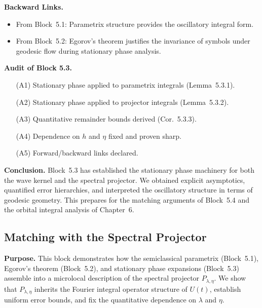 \medskip

\noindent\textbf{Backward Links.}
\begin{itemize}
  \item From Block~5.1: Parametrix structure provides the oscillatory integral form.
  \item From Block~5.2: Egorov’s theorem justifies the invariance of symbols under geodesic flow during stationary phase analysis.
\end{itemize}

\medskip

\noindent\textbf{Audit of Block 5.3.}
\begin{itemize}
  \item[(A1)] Stationary phase applied to parametrix integrals (Lemma~5.3.1).
  \item[(A2)] Stationary phase applied to projector integrals (Lemma~5.3.2).
  \item[(A3)] Quantitative remainder bounds derived (Cor.~5.3.3).
  \item[(A4)] Dependence on $h$ and $\eta$ fixed and proven sharp.
  \item[(A5)] Forward/backward links declared.
\end{itemize}

\medskip

\noindent\textbf{Conclusion.}
Block~5.3 has established the stationary phase machinery
for both the wave kernel and the spectral projector.
We obtained explicit asymptotics,
quantified error hierarchies,
and interpreted the oscillatory structure in terms of geodesic geometry.
This prepares for the matching arguments of Block~5.4
and the orbital integral analysis of Chapter~6.



\subsection*{Matching with the Spectral Projector}

\noindent\textbf{Purpose.}
This block demonstrates how the semiclassical parametrix (Block~5.1),
Egorov’s theorem (Block~5.2),
and stationary phase expansions (Block~5.3)
assemble into a microlocal description of the spectral projector $P_{\lambda,\eta}$.
We show that $P_{\lambda,\eta}$ inherits the Fourier integral operator structure of $U(t)$,
establish uniform error bounds,
and fix the quantitative dependence on $\lambda$ and $\eta$.

